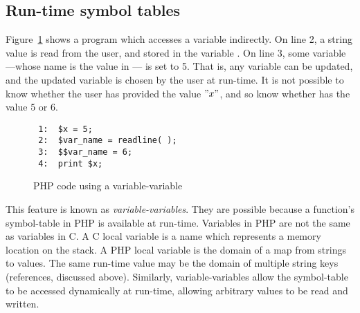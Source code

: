\subsection{Run-time symbol tables}
\label{run-time-tables}

Figure~\ref{variable-variable} shows a program which accesses a
variable indirectly.
On line 2, a string value is read from the user, and stored in the
variable .  On line 3, some variable---whose name is the
value in  --- is set to 5.  That is, any variable can be
updated, and the updated variable is chosen by the user at run-time.
It is not possible to know whether the user has provided the value
$"x"$, and so know whether  has the value $5$ or $6$.

\begin{figure}[thp]
\begin{verbatim}
 1:  $x = 5;
 2:  $var_name = readline( );
 3:  $$var_name = 6;
 4:  print $x;
\end{verbatim}
\caption{PHP code using a variable-variable}
\label{variable-variable}
\end{figure}

This feature is known as \textit{variable-variables}.  They are
possible because a function's symbol-table in PHP is available at
run-time.  Variables in PHP are not the same as variables in C.  A C
local variable is a name which represents a memory location on the
stack.  A PHP local variable is the domain of a map from strings to
values.  The same run-time value may be the domain of multiple string
keys (references, discussed above).  Similarly, variable-variables
allow the symbol-table to be accessed dynamically at run-time,
allowing arbitrary values to be read and written.

